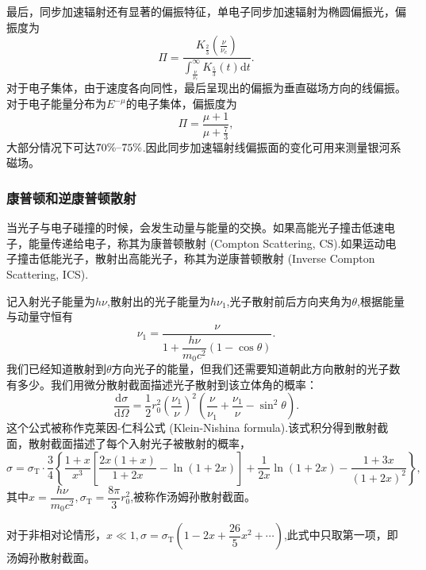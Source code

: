 \documentclass[../天体物理基础.tex]{subfiles}
\begin{document}
最后，同步加速辐射还有显著的偏振特征，单电子同步加速辐射为椭圆偏振光，偏振度为
\begin{equation}
\Pi=\frac{K_{\frac{2}{3}}\left(\frac{\nu}{\nu_{c}}\right)}{\int_{\frac{\nu}{\nu_{c}}}^{\infty}K_{\frac{5}{3}}\left(t\right)\mathrm{d}t}.
\end{equation}
对于电子集体，由于速度各向同性，最后呈现出的偏振为垂直磁场方向的线偏振。对于电子能量分布为$E^{-\mu}$的电子集体，偏振度为
\begin{equation}
\Pi=\frac{\mu+1}{\mu+\frac{7}{3}},
\end{equation}
大部分情况下可达$70\%\text{\textendash}75\%$.因此同步加速辐射线偏振面的变化可用来测量银河系磁场。

\subsubsection{康普顿和逆康普顿散射}
当光子与电子碰撞的时候，会发生动量与能量的交换。如果高能光子撞击低速电子，能量传递给电子，称其为康普顿散射 (Compton Scattering, CS).如果运动电子撞击低能光子，散射出高能光子，称其为逆康普顿散射 (Inverse Compton Scattering, ICS).

记入射光子能量为$h\nu$,散射出的光子能量为$h\nu_{1}$,光子散射前后方向夹角为$\theta$,根据能量与动量守恒有
\begin{equation}
\nu_{1}=\frac{\nu}{1+\dfrac{h\nu}{m_{0}c^{2}}\left(1-\cos\theta\right)}.
\end{equation}
我们已经知道散射到$\theta$方向光子的能量，但我们还需要知道朝此方向散射的光子数有多少。我们用微分散射截面描述光子散射到该立体角的概率：
\begin{equation}
\frac{\mathrm{d}\sigma}{\mathrm{d}\Omega}=\frac{1}{2}r_{0}^{2}\left(\frac{\nu_{1}}{\nu}\right)^{2}\left(\frac{\nu}{\nu_{1}}+\frac{\nu_{1}}{\nu}-\sin^{2}\theta\right).
\end{equation}
这个公式被称作克莱因{}-{}仁科公式 (Klein-Nishina formula).该式积分得到散射截面，散射截面描述了每个入射光子被散射的概率，
\begin{equation}
\sigma=\sigma_{\text{T}}\cdot\frac34\left\{\frac{1+x}{x^{3}}\left[\frac{2x\left(1+x\right)}{1+2x}-\ln\left(1+2x\right)\right]+\frac1{2x}\ln\left(1+2x\right)-\frac{1+3x}{\left(1+2x\right)^{2}}\right\},
\end{equation}
其中$x=\dfrac{h\nu}{m_{0}c^{2}},\sigma_{\text{T}}=\dfrac{8\pi}{3}r_{0}^{2}$,被称作汤姆孙散射截面。

对于非相对论情形，$x\ll1,\sigma=\sigma_{\text{T}}\left(1-2x+\dfrac{26}{5}x^{2}+\cdots\right)$,此式中只取第一项，即汤姆孙散射截面。
\end{document}
